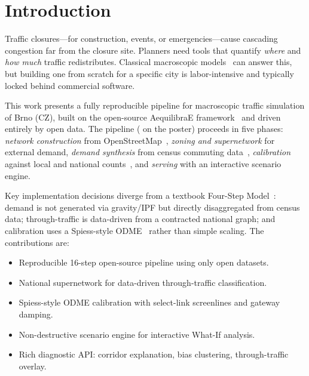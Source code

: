 \documentclass{ExcelAtFIT}
\affiliation{*%
  \href{mailto:xkanko00@stud.fit.vutbr.cz}{xkanko00@stud.fit.vutbr.cz},
  \textit{Faculty of Information Technology, Brno University of Technology}}
\begin{document}
\startdocument


\section{Introduction}

Traffic closures---for construction, events, or emergencies---cause cascading congestion far from the closure site.
Planners need tools that quantify \emph{where} and \emph{how much} traffic redistributes.
Classical macroscopic models~\cite{Ortuzar2011,Sheffi1985} can answer this, but building one from scratch for a specific city is labor-intensive and typically locked behind commercial software.

This work presents a fully reproducible pipeline for macroscopic traffic simulation of Brno (CZ), built on the open-source AequilibraE framework~\cite{AequilibraE} and driven entirely by open data.
The pipeline ( on the poster) proceeds in five phases: \emph{network construction} from OpenStreetMap~\cite{OSM}, \emph{zoning and supernetwork} for external demand, \emph{demand synthesis} from census commuting data~\cite{SLDB2021}, \emph{calibration} against local and national counts~\cite{CSD2025}, and \emph{serving} with an interactive scenario engine.

Key implementation decisions diverge from a textbook Four-Step Model~\cite{Ortuzar2011}: demand is not generated via gravity/IPF but directly disaggregated from census data; through-traffic is data-driven from a contracted national graph; and calibration uses a Spiess-style ODME~\cite{Cascetta2009} rather than simple scaling.
The contributions are:
\begin{itemize}
  \item Reproducible 16-step open-source pipeline using only open datasets.
  \item National supernetwork for data-driven through-traffic classification.
  \item Spiess-style ODME calibration with select-link screenlines and gateway damping.
  \item Non-destructive scenario engine for interactive What-If analysis.
  \item Rich diagnostic API: corridor explanation, bias clustering, through-traffic overlay.
\end{itemize}
\end{document}
